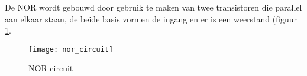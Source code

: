 De NOR wordt gebouwd door gebruik te maken van twee transistoren die parallel aan elkaar staan, de beide basis vormen de ingang en er is een weerstand (figuur \ref{circuit:nor}.

\begin{figure}[h]
\texttt{[image: nor\_circuit]}
\centering
\caption{NOR circuit}
\label{circuit:nor}
\end{figure}

